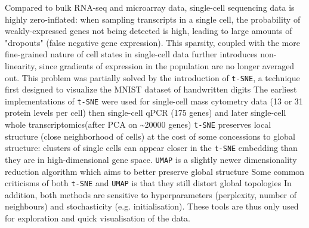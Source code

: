 Compared to bulk RNA-seq and microarray data, single-cell sequencing data is highly zero-inflated: when sampling transcripts in a single cell, the probability of weakly-expressed genes not being detected is high, leading to large amounts of "dropouts" (false negative gene expression). This sparsity, coupled with the more fine-grained nature of cell states in single-cell data further introduces non-linearity, since gradients of expression in the population are no longer averaged out. This problem was partially solved by the introduction of \verb|t-SNE|, a technique first designed to visualize the MNIST dataset of handwritten digits The earliest implementations of \verb|t-SNE| were used for single-cell mass cytometry data (13 or 31 protein levels per cell) then single-cell qPCR (175 genes) and later single-cell whole transcriptomics(after PCA on \textasciitilde{\num{20000}} genes) \verb|t-SNE| preserves local structure (close neighborhood of cells) at the cost of some concessions to global structure: clusters of single cells can appear closer in the \verb|t-SNE| embedding than they are in high-dimensional gene space. \verb|UMAP| is a slightly newer dimensionality reduction algorithm which aims to better preserve global structure Some common criticisms of both \verb|t-SNE| and \verb|UMAP| is that they still distort global topologies In addition, both methods are sensitive to hyperparameters (perplexity, number of neighbours) and stochasticity (e.g. initialisation). These tools are thus only used for exploration and quick visualisation of the data.


